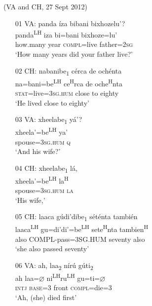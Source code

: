 \ea (VA and CH, 27 Sept 2012)
\begin{itemize}
\item[01 VA:]
\glll panda \'{i}za bibani bixhozelu'? \\               
panda\textsuperscript{LH} iza bi=bani bixhoze=lu' \\
how.many year \textsc{compl}=live father=\textsc{2sg} \\
\glt `How many years did your father live?'
 

\item[02 CH:]
\glll nabanibe\textsubscript{1} c\'{e}rca de och\'{e}nta \\   
na=bani=be\textsuperscript{LH} ce\textsuperscript{H}rca de oche\textsuperscript{H}nta \\
\textsc{stat}=live=\textsc{3sg.hum} close to eighty \\
\glt `He lived close to eighty'


\item[03 VA:]
\glll xheelabe\textsubscript{1} y\'{a}'? \\
xheela'=be\textsuperscript{LH} ya' \\
spouse=\textsc{3sg.hum} \textsc{q} \\
\glt `And his wife?'


\item[04 CH:]
\glll xheelabe\textsubscript{1} l\'{a}, \\
xheela'=be\textsuperscript{LH} la\textsuperscript{H} \\
spouse=\textsc{3sg.hum} \textsc{la}	\\
\glt `His wife,'


\item[05 CH:]
\glll laaca g\'{u}di'dibe\textsubscript{1} s\'{e}t\'{e}nta tambi\'{e}n \\
laaca\textsuperscript{LH} gu=di'di'=be\textsuperscript{LH} sete\textsuperscript{H}nta tambien\textsuperscript{H}  \\
also	COMPL-pass=3SG.HUM seventy also \\
\glt `she also passed seventy'


\item[06 VA:]
\glll ah, laa\textsubscript{2} n\'{i}r\'{u} g\'{u}ti\textsubscript{2}  \\
ah laa={$\varnothing$} ni\textsuperscript{LH}ru\textsuperscript{LH} gu=ti={$\varnothing$}  \\
\textsc{intj} \textsc{base}=\textsc{3} front \textsc{compl}=die=\textsc{3}  \\
\glt `Ah, (she) died first'



\end{itemize}
